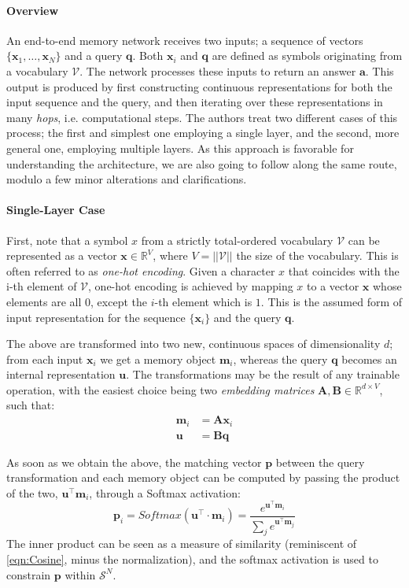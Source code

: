 \documentclass[]{article}
\begin{document}
\paragraph{Overview}
An end-to-end memory network receives two inputs; a sequence of vectors $\{\pmb{x}_1,\dots,\pmb{x}_N\}$ and a query $\pmb{q}$. Both $\pmb{x}_i$ and $\pmb{q}$ are defined as symbols originating from a vocabulary $\mathcal{V}$. The network processes these inputs to return an answer $\pmb{a}$. This output is produced by first constructing continuous representations for both the input sequence and the query, and then iterating over these representations in many \textit{hops}, i.e. computational steps. The authors treat two different cases of this process; the first and simplest one employing a single layer, and the second, more general one, employing multiple layers. As this approach is favorable for understanding the architecture, we are also going to follow along the same route, modulo a few minor alterations and clarifications.

\paragraph{Single-Layer Case} First, note that a symbol $x$ from a strictly total-ordered vocabulary $\mathcal{V}$ can be represented as a vector $\pmb{x} \in \mathbb{R}^{V}$, where $V = ||\mathcal{V}||$ the size of the vocabulary. This is often referred to as \textit{one-hot encoding}. Given a character $x$ that coincides with the i-th element of $\mathcal{V}$, one-hot encoding is achieved by mapping $x$ to a vector $\pmb{x}$ whose elements are all $0$, except the $i$-th element which is $1$. This is the assumed form of input representation for the sequence $\{\pmb{x}_i\}$ and the query $\pmb{q}$. 

The above are transformed into two new, continuous spaces of dimensionality $d$; from each input $\pmb{x}_i$ we get a memory object $\pmb{m}_i$, whereas the query $\pmb{q}$ becomes an internal representation $\pmb{u}$. The transformations may be the result of any trainable operation, with the easiest choice being two \textit{embedding matrices} $\pmb{A}, \pmb{B} \in \mathbb{R}^{d\times V}$, such that:
\begin{align}
\pmb{m}_i &= \pmb{A}\pmb{x}_i \tag{Memory Transformation} \\
\pmb{u} &= \pmb{B}\pmb{q} \tag{Query Transformation}
\end{align}

As soon as we obtain the above, the matching vector $\pmb{p}$ between the query transformation and each memory object can be computed by passing the product of the two, $\pmb{u}^\top \pmb{m}_i$, through a Softmax activation:
\[
\tag{Memory Matching}
\pmb{p}_i = Softmax(\pmb{u}^\top \cdot \pmb{m}_i) = \frac{e^{\pmb{u}^\top\pmb{m}_i}}{\sum_j{e^{\pmb{u}^\top\pmb{m}_j}}}
\]
The inner product can be seen as a measure of similarity (reminiscent of \ref{eqn:Cosine}, minus the normalization), and the softmax activation is used to constrain $\pmb{p}$ within $\mathcal{S}^N$. 
\end{document}
